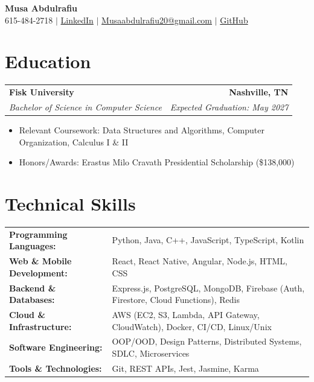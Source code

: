 \documentclass[10pt,letterpaper]{article}
\newcommand{\resumeItemListStart}{\begin{itemize}}
\newcommand{\resumeItemListEnd}{\end{itemize}}
\newcommand{\resumeSubheading}[4]{
  \vspace{1pt}
  \begin{tabularx}{\textwidth}{Xr}
    \textbf{#1} & #2 \\
    \textit{#3} & \textit{#4} \\
  \end{tabularx}\vspace{-3pt}
}
\begin{document}
\begin{center}
    {\LARGE \textbf{Musa Abdulrafiu}}\\
    615-484-2718 $|$ \href{https://www.linkedin.com/in/musa-abdulrafiu}{LinkedIn} $|$ \href{mailto:Musaabdulrafiu20@gmail.com}{Musaabdulrafiu20@gmail.com} $|$ \href{https://github.com/MMAbdul153}{GitHub}
\end{center}

\section*{Education}
\resumeSubheading
{Fisk University} {\textbf{Nashville, TN}}
{Bachelor of Science in Computer Science} {Expected Graduation: May 2027}
\resumeItemListStart
    \item Relevant Coursework: Data Structures and Algorithms, Computer Organization, Calculus I \& II
    \item Honors/Awards: Erastus Milo Cravath Presidential Scholarship (\$138,000)
\resumeItemListEnd

\section*{Technical Skills}
\begin{tabularx}{\textwidth}{@{}lX@{}}
\textbf{Programming Languages:} & Python, Java, C++, JavaScript, TypeScript, Kotlin \\
\textbf{Web \& Mobile Development:} & React, React Native, Angular, Node.js, HTML, CSS \\
\textbf{Backend \& Databases:} & Express.js, PostgreSQL, MongoDB, Firebase (Auth, Firestore, Cloud Functions), Redis \\
\textbf{Cloud \& Infrastructure:} & AWS (EC2, S3, Lambda, API Gateway, CloudWatch), Docker, CI/CD, Linux/Unix \\
\textbf{Software Engineering:} & OOP/OOD, Design Patterns, Distributed Systems, SDLC, Microservices \\
\textbf{Tools \& Technologies:} & Git, REST APIs, Jest, Jasmine, Karma \\
\end{tabularx}
\end{document}
